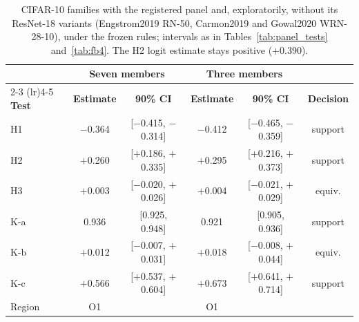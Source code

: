 \begin{table}[!t]
\centering
\caption{CIFAR-10 families with the registered panel and, exploratorily, without its ResNet-18 variants (Engstrom2019 RN-50, Carmon2019 and Gowal2020 WRN-28-10), under the frozen rules; intervals as in Tables~\ref{tab:panel_tests} and~\ref{tab:fb4}. The H2 logit estimate stays positive ($+0.390$).}
\label{tab:reduced_panel}
\scriptsize
\setlength{\tabcolsep}{1.6pt}
\begin{tabular}{lccccc}
\toprule
& \multicolumn{2}{c}{\textbf{Seven members}} & \multicolumn{2}{c}{\textbf{Three members}} & \\
\cmidrule(lr){2-3} \cmidrule(lr){4-5}
\textbf{Test} & \textbf{Estimate} & \textbf{90\% CI} & \textbf{Estimate} & \textbf{90\% CI} & \textbf{Decision} \\
\midrule
H1 & $-$0.364 & [$-$0.415, $-$0.314] & $-$0.412 & [$-$0.465, $-$0.359] & support \\
H2 & $+$0.260 & [$+$0.186, $+$0.335] & $+$0.295 & [$+$0.216, $+$0.373] & support \\
H3 & $+$0.003 & [$-$0.020, $+$0.026] & $+$0.004 & [$-$0.021, $+$0.029] & equiv. \\
K-a & 0.936 & [0.925, 0.948] & 0.921 & [0.905, 0.936] & support \\
K-b & $+$0.012 & [$-$0.007, $+$0.031] & $+$0.018 & [$-$0.008, $+$0.044] & equiv. \\
K-c & $+$0.566 & [$+$0.537, $+$0.604] & $+$0.673 & [$+$0.641, $+$0.714] & support \\
Region & O1 & & O1 & & \\
\bottomrule
\end{tabular}
\end{table}
